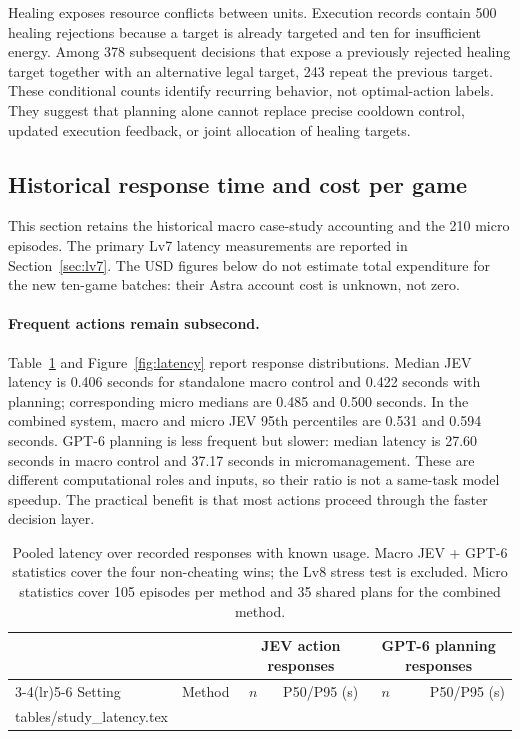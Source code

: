 \documentclass{article}
\makeatletter
\newcommand{\tablerows}[1]{\@@input #1 }
\newcommand{\captionbelowtable}{\normalsize\setlength{\abovecaptionskip}{7pt}\setlength{\belowcaptionskip}{0pt}}
\makeatother
\begin{document}
Healing exposes resource conflicts between units. Execution records contain 500 healing rejections because a target is already targeted and ten for insufficient energy. Among 378 subsequent decisions that expose a previously rejected healing target together with an alternative legal target, 243 repeat the previous target. These conditional counts identify recurring behavior, not optimal-action labels. They suggest that planning alone cannot replace precise cooldown control, updated execution feedback, or joint allocation of healing targets.

\subsection{Historical response time and cost per game}
\label{sec:efficiency}

This section retains the historical macro case-study accounting and the 210 micro episodes. The primary Lv7 latency measurements are reported in Section~\ref{sec:lv7}. The USD figures below do not estimate total expenditure for the new ten-game batches: their Astra account cost is unknown, not zero.

\paragraph{Frequent actions remain subsecond.}
Table~\ref{tab:latency} and Figure~\ref{fig:latency} report response distributions. Median JEV latency is 0.406 seconds for standalone macro control and 0.422 seconds with planning; corresponding micro medians are 0.485 and 0.500 seconds. In the combined system, macro and micro JEV 95th percentiles are 0.531 and 0.594 seconds. GPT-6 planning is less frequent but slower: median latency is 27.60 seconds in macro control and 37.17 seconds in micromanagement. These are different computational roles and inputs, so their ratio is not a same-task model speedup. The practical benefit is that most actions proceed through the faster decision layer.

\begin{table}[t]
\centering\small
\begin{tabular}{llrrrr}
\toprule
& & \multicolumn{2}{c}{JEV action responses} & \multicolumn{2}{c}{GPT-6 planning responses} \\
\cmidrule(lr){3-4}\cmidrule(lr){5-6}
Setting & Method & \(n\) & P50/P95 (s) & \(n\) & P50/P95 (s) \\
\midrule
\tablerows{tables/study_latency.tex}
\bottomrule
\end{tabular}
\captionbelowtable
\caption{Pooled latency over recorded responses with known usage. Macro JEV + GPT-6 statistics cover the four non-cheating wins; the Lv8 stress test is excluded. Micro statistics cover 105 episodes per method and 35 shared plans for the combined method.}
\label{tab:latency}
\end{table}
\end{document}
